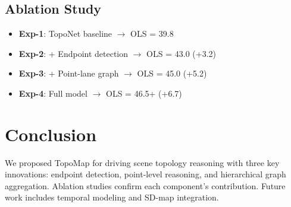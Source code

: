 \documentclass[conference, a4paper, 10pt]{IEEEtran}
\begin{document}
\subsection{Ablation Study}
\begin{itemize}
    \item \textbf{Exp-1}: TopoNet baseline $\rightarrow$ OLS = 39.8
    \item \textbf{Exp-2}: + Endpoint detection $\rightarrow$ OLS = 43.0 (+3.2)
    \item \textbf{Exp-3}: + Point-lane graph $\rightarrow$ OLS = 45.0 (+5.2)
    \item \textbf{Exp-4}: Full model $\rightarrow$ OLS = 46.5+ (+6.7)
\end{itemize}

\section{Conclusion}
We proposed TopoMap for driving scene topology reasoning with three key innovations: endpoint detection, point-level reasoning, and hierarchical graph aggregation. 
Ablation studies confirm each component's contribution. 
Future work includes temporal modeling and SD-map integration.



\end{document}
